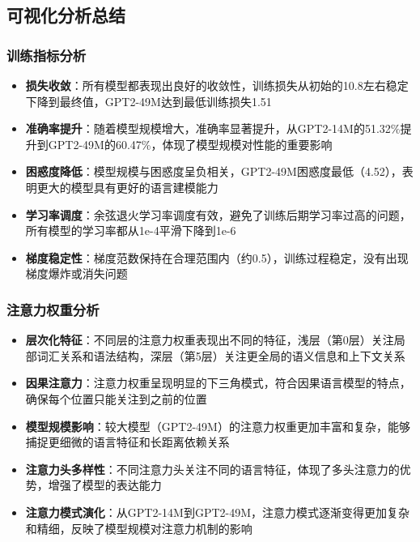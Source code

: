 \documentclass{article}
\begin{document}
\vspace{0.5cm}

\subsection{可视化分析总结}

\subsubsection{训练指标分析}
\begin{itemize}
    \item \textbf{损失收敛}：所有模型都表现出良好的收敛性，训练损失从初始的10.8左右稳定下降到最终值，GPT2-49M达到最低训练损失1.51
    \item \textbf{准确率提升}：随着模型规模增大，准确率显著提升，从GPT2-14M的51.32\%提升到GPT2-49M的60.47\%，体现了模型规模对性能的重要影响
    \item \textbf{困惑度降低}：模型规模与困惑度呈负相关，GPT2-49M困惑度最低（4.52），表明更大的模型具有更好的语言建模能力
    \item \textbf{学习率调度}：余弦退火学习率调度有效，避免了训练后期学习率过高的问题，所有模型的学习率都从1e-4平滑下降到1e-6
    \item \textbf{梯度稳定性}：梯度范数保持在合理范围内（约0.5），训练过程稳定，没有出现梯度爆炸或消失问题
\end{itemize}

\subsubsection{注意力权重分析}
\begin{itemize}
    \item \textbf{层次化特征}：不同层的注意力权重表现出不同的特征，浅层（第0层）关注局部词汇关系和语法结构，深层（第5层）关注更全局的语义信息和上下文关系
    \item \textbf{因果注意力}：注意力权重呈现明显的下三角模式，符合因果语言模型的特点，确保每个位置只能关注到之前的位置
    \item \textbf{模型规模影响}：较大模型（GPT2-49M）的注意力权重更加丰富和复杂，能够捕捉更细微的语言特征和长距离依赖关系
    \item \textbf{注意力头多样性}：不同注意力头关注不同的语言特征，体现了多头注意力的优势，增强了模型的表达能力
    \item \textbf{注意力模式演化}：从GPT2-14M到GPT2-49M，注意力模式逐渐变得更加复杂和精细，反映了模型规模对注意力机制的影响
\end{itemize}
\end{document}
